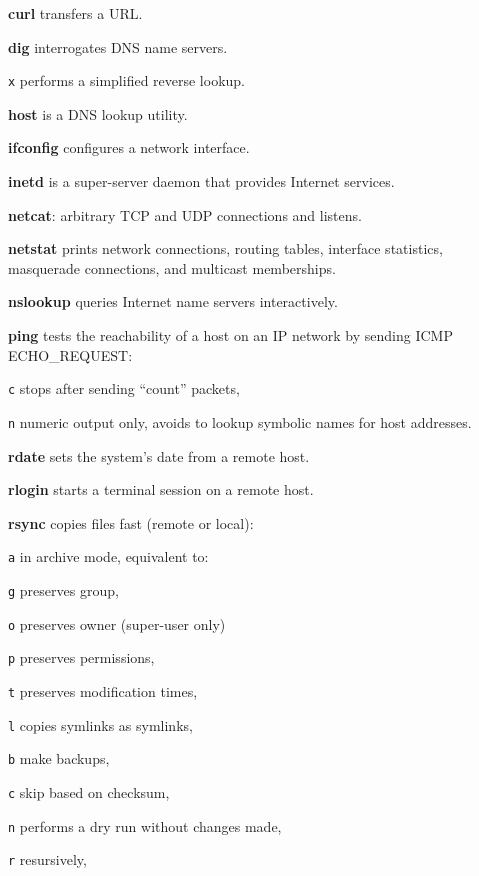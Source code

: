 \begin{enumx}
\item [\cmd] \textbf{curl} transfers a URL.
\item [\cmd] \textbf{dig} interrogates DNS name servers.                        
\item [\texttt{x}] performs a simplified reverse lookup. 
\item [\cmd] \textbf{host} is a DNS lookup utility.  
\item [\cmd] \textbf{ifconfig} configures a network interface.   
\item [\cmd] \textbf{inetd} is a super-server daemon that provides Internet services.
\item [\cmd] \textbf{netcat}: arbitrary TCP and UDP connections and listens.
\item [\cmd] \textbf{netstat} prints network connections, routing tables, 
interface statistics, masquerade connections, and multicast memberships.
\item [\cmd] \textbf{nslookup} queries Internet name servers interactively.
\item [\cmd] \textbf{ping} tests the reachability of a host 
on an IP network by sending ICMP ECHO\_REQUEST:
\item [\texttt{c}] stops after sending ``count'' packets,
\item [\texttt{n}] numeric output only, 
	avoids to lookup symbolic names for host addresses. 
\item [\cmd] \textbf{rdate} sets the system's date from a remote host.
\item [\cmd] \textbf{rlogin} starts a terminal session on a remote host.
\item [\cmd] \textbf{rsync} copies files fast (remote or local):
\item [\texttt{a}] in archive mode, equivalent to:
\item [\texttt{g}] preserves group,
\item [\texttt{o}] preserves owner (super-user only)
\item [\texttt{p}] preserves permissions,
\item [\texttt{t}] preserves modification times,
\item [\texttt{l}] copies symlinks as symlinks,
\item [\texttt{b}] make backups, 
\item [\texttt{c}] skip based on checksum, 
\item [\texttt{n}] performs a dry run without changes made, 
\item [\texttt{r}] resursively, 

\end{enumx}

